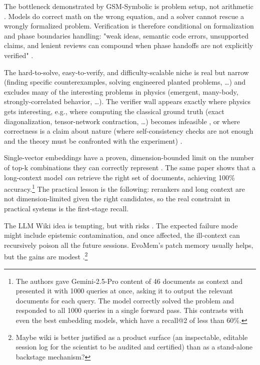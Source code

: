 The bottleneck demonstrated by GSM-Symbolic is problem setup, not arithmetic \cite{2410.05229}. Models do correct math on the wrong equation, and a solver cannot rescue a wrongly formalized problem. Verification is therefore conditional on formalization and phase boundaries handling: "weak ideas, semantic code errors, unsupported claims, and lenient reviews can compound when phase handoffs are not explicitly verified"
\cite{2605.18661}.

The hard-to-solve, easy-to-verify, and difficulty-scalable niche is real but narrow (finding specific counterexamples, solving engineered planted problems, \ldots) and excludes many of the interesting problems in physics (emergent, many-body, strongly-correlated behavior, \ldots). The verifier wall appears exactly where physics gets interesting, e.g., where computing the classical ground truth (exact diagonalization, tensor-network contraction, \ldots) becomes infeasible \cite{Eisert2020}, or where correctness is a claim about nature (where self-consistency checks are not enough and the theory must be confronted with the experiment) \cite{Popper2005}.

Single-vector embeddings have a proven, dimension-bounded limit on the number of top-k combinations they can correctly represent \cite{2508.21038}. The same paper shows that a long-context model \emph{can} retrieve the right set of documents, achieving 100\% accuracy.\footnote{
    The authors gave Gemini-2.5-Pro content of 46 documents as context and presented it with 1000 queries at once, asking it to output the relevant documents for each query. The model correctly solved the problem and responded to all 1000 queries in a single forward pass. This contrasts with even the best embedding models, which have a recall@2 of less than 60\%.
}
The practical lesson is the following: rerankers and long context are not dimension-limited given the right candidates, so the real constraint in practical systems is the first-stage recall.

The LLM Wiki idea is tempting, but with risks \cite{karpathy2026llmwiki}. The expected failure mode might include epistemic contamination, and once affected, the ill-context can recursively poison all the future sessions. EvoMem's patch memory usually helps, but the gains are modest \cite{2606.13681}.\footnote{
    Maybe wiki is better justified as a product surface (an inspectable, editable session log for the scientist to be audited and certified) than as a stand-alone backstage mechanism?
}

